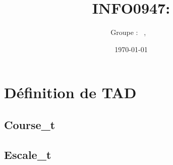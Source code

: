 \documentclass[a4paper, 11pt, oneside]{article}
\title{INFO0947: \intitule}
\author{Groupe \GrNbr : \PrenomUN~\textsc{\NomUN}, \PrenomDEUX~\textsc{\NomDEUX}}
\date{\today}
\newcommand{\tablemat}{~}
\renewcommand{\tablemat}{\tableofcontents}
\begin{document}
\maketitle
\newpage
\tablemat
\newpage

\section{Définition de TAD}

	\subsection{Course\_t}
	
	\subsection{Escale\_t}
\end{document}
